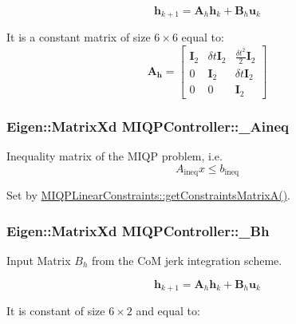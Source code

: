 \[ \mathbf{h}_{k+1} = \mathbf{A}_h \mathbf{h}_k + \mathbf{B}_h \mathbf{u}_k \]

\-It is a constant matrix of size $6\times6$ equal to\-: \[ \mathbf{A_h} = \left[ \begin{array}{ccc} \mathbf{I}_2 & \delta t \mathbf{I}_2 & \frac{\delta t^2}{2} \mathbf{I}_2 \\ 0 & \mathbf{I}_2 & \delta t \mathbf{I}_2 \\ 0 & 0 & \mathbf{I}_2 \end{array} \right] \] \hypertarget{classMIQPController_a7678fd8e1c08986d7ae0dc1a884040e1}{
\subsubsection[{\-\_\-\-Aineq}]{\setlength{\rightskip}{0pt plus 5cm}\-Eigen\-::\-Matrix\-Xd {\bf \-M\-I\-Q\-P\-Controller\-::\-\_\-\-Aineq}}}\label{classMIQPController_a7678fd8e1c08986d7ae0dc1a884040e1}
\-Inequality matrix of the \-M\-I\-Q\-P problem, i.\-e. \[ A_{\text{ineq}} x \leq b_{\text{ineq}} \]

\-Set by \hyperlink{classMIQPLinearConstraints_ab556e990dcc0b1fcd152f41a8c00e1f6}{\-M\-I\-Q\-P\-Linear\-Constraints\-::get\-Constraints\-Matrix\-A()}. \hypertarget{classMIQPController_a9a989875871a898f0ad19b441a2c67ba}{
\subsubsection[{\-\_\-\-Bh}]{\setlength{\rightskip}{0pt plus 5cm}\-Eigen\-::\-Matrix\-Xd {\bf \-M\-I\-Q\-P\-Controller\-::\-\_\-\-Bh}}}\label{classMIQPController_a9a989875871a898f0ad19b441a2c67ba}
\-Input \-Matrix $B_h$ from the \-Co\-M jerk integration scheme.

\[ \mathbf{h}_{k+1} = \mathbf{A}_h \mathbf{h}_k + \mathbf{B}_h \mathbf{u}_k \]

\-It is constant of size $6\times2$ and equal to\-:

